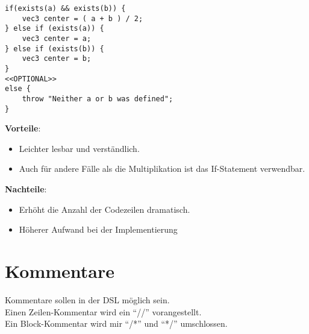 \begin{enumerate}
\begin{lstlisting}[language=prepro, label={lst:OptionalImportExample_If}, caption={PrePro-Code mit If-Statements und der exists-Funktion}, captionpos=b]
if(exists(a) && exists(b)) {
    vec3 center = ( a + b ) / 2;
} else if (exists(a)) {
    vec3 center = a;
} else if (exists(b)) {
    vec3 center = b;
}
<<OPTIONAL>>
else {
	throw "Neither a or b was defined";
}
\end{lstlisting}
\textbf{Vorteile}:
\begin{itemize}
\item Leichter lesbar und verständlich.
\item Auch für andere Fälle als die Multiplikation ist das If-Statement verwendbar.
\end{itemize}
\textbf{Nachteile}:
\begin{itemize}
\item Erhöht die Anzahl der Codezeilen dramatisch.
\item Höherer Aufwand bei der Implementierung
\end{itemize}

\end{enumerate}

\section{Kommentare}
Kommentare sollen in der \ac{DSL} möglich sein.\\
Einen Zeilen-Kommentar wird ein ``//'' vorangestellt.\\
Ein Block-Kommentar wird mir ``/*'' und ``*/'' umschlossen.

\endinput
